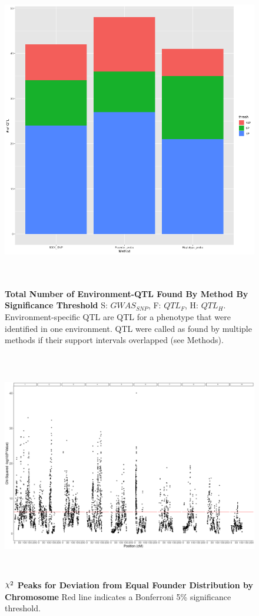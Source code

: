 \documentclass[article,9pt,twocolumn,twoside]{rilabRxiv}
\DeclareRobustCommand{\rchi}{{\mathpalette\irchi\relax}}
\newcommand{\irchi}[2]{\raisebox{\depth}{$#1\chi$}} %
\begin{document}
\begin{figure}[ht]
\centering
\includegraphics[width=\textwidth,height=14cm]{figures/threshold_by_method_counts.png}
\caption{\textbf{Total Number of Environment-QTL Found By Method By Significance Threshold} S: $GWAS_{SNP}$, F: $QTL_F$, H: $QTL_H$. Environment-specific QTL are QTL for a phenotype that were identified in one environment. QTL were called as found by multiple methods if their support intervals overlapped (see Methods).}
\label{fig:supfigure3}
\end{figure}

\begin{figure}[ht]
\centering
\includegraphics[width=16cm,height=10cm]{figures/all_chrom_founder_chi_sq.png}
\caption{\textbf{$\rchi^2$ Peaks for Deviation from Equal Founder Distribution by Chromosome} Red line indicates a Bonferroni 5\% significance threshold.}
\label{fig:supfigure11}
\end{figure}
\end{document}
